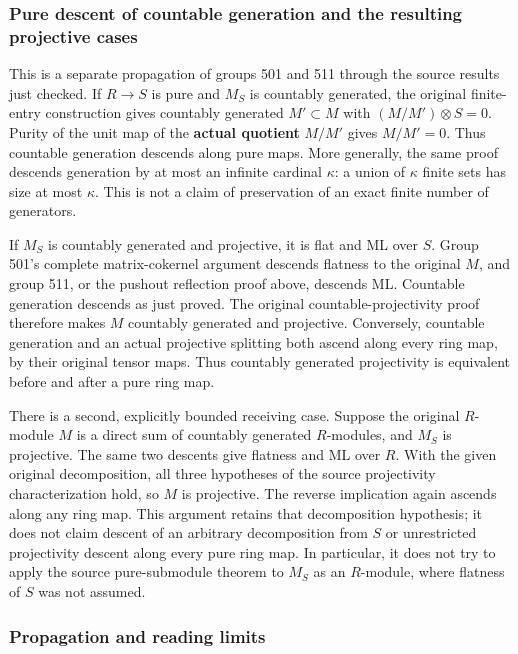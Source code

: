 \subsubsection{Pure descent of countable generation and the resulting projective cases}\label{pure-descent-of-countable-generation-and-the-resulting-projective-cases}

This is a separate propagation of groups 501 and 511 through the source results just checked. If \(R\to S\) is pure and \(M_S\) is countably generated, the original finite-entry construction gives countably generated \(M'\subset M\) with \((M/M')\otimes S=0\). Purity of the unit map of the \textbf{actual quotient} \(M/M'\) gives \(M/M'=0\). Thus countable generation descends along pure maps. More generally, the same proof descends generation by at most an infinite cardinal \(\kappa\): a union of \(\kappa\) finite sets has size at most \(\kappa\). This is not a claim of preservation of an exact finite number of generators.

If \(M_S\) is countably generated and projective, it is flat and ML over \(S\). Group 501's complete matrix-cokernel argument descends flatness to the original \(M\), and group 511, or the pushout reflection proof above, descends ML. Countable generation descends as just proved. The original countable-projectivity proof therefore makes \(M\) countably generated and projective. Conversely, countable generation and an actual projective splitting both ascend along every ring map, by their original tensor maps. Thus countably generated projectivity is equivalent before and after a pure ring map.

There is a second, explicitly bounded receiving case. Suppose the original \(R\)-module \(M\) is a direct sum of countably generated \(R\)-modules, and \(M_S\) is projective. The same two descents give flatness and ML over \(R\). With the given original decomposition, all three hypotheses of the source projectivity characterization hold, so \(M\) is projective. The reverse implication again ascends along any ring map. This argument retains that decomposition hypothesis; it does not claim descent of an arbitrary decomposition from \(S\) or unrestricted projectivity descent along every pure ring map. In particular, it does not try to apply the source pure-submodule theorem to \(M_S\) as an \(R\)-module, where flatness of \(S\) was not assumed.

\subsubsection{Propagation and reading limits}\label{propagation-and-reading-limits}

